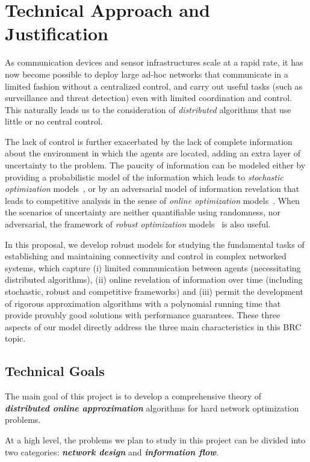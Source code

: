 \section{Technical Approach and Justification}

As communication devices and sensor infrastructures scale at a rapid
rate, it has now become possible to deploy large ad-hoc networks that
communicate in a limited fashion without a centralized control, and
carry out useful tasks (such as surveillance and threat detection)
even with limited coordination and control. This naturally leads us to
the consideration of {\em distributed} algorithms that use little or
no central control.

The lack of control is further exacerbated by the lack of complete
information about the environment in which the agents are located,
adding an extra layer of uncertainty to the problem. The paucity of
information can be modeled either by providing a probabilistic model
of the information which leads to {\em stochastic optimization}
models~\cite{bl97,rs06}, or by an adversarial model of information
revelation that leads to competitive analysis in the sense of {\em online
optimization} models~\cite{be98}. When the scenarios of uncertainty are neither quantifiable using randomness, nor adversarial, the framework of {\em robust optimization} models~\cite{dgrs05} is also useful.

In this proposal, we develop robust models for studying the
fundamental tasks of establishing and maintaining connectivity and
control in complex networked systems, which capture (i) limited
communication between agents (necessitating distributed algorithms),
(ii) online revelation of information over time (including stochastic,
robust and competitive frameworks) and (iii) permit the development of
rigorous approximation algorithms with a polynomial running time that
provide provably good solutions with performance guarantees. These
three aspects of our model directly address the three main
characteristics in this BRC topic.

\subsection{Technical Goals}
\label{sec:goals}

The main goal of this project is to develop a comprehensive theory of
{\bf \em distributed online approximation}\/ algorithms for hard network
optimization problems.
\iffalse (Repeats what is in the prev para)
This proposal encompasses several challenging
aspects of mission-critical networked systems: (a) there is
considerable uncertainty in the inputs and the network environment
under which the systems operate; (b) the inputs as well as the
underlying network may, in fact, be under adversarial control; (c) the
algorithms running these networked systems need to be
fully-distributed.
\fi
At a high level, the problems we plan to study in this project can be
divided into two categories: {\bf \em network design}\/ and {\bf \em
information flow}.

